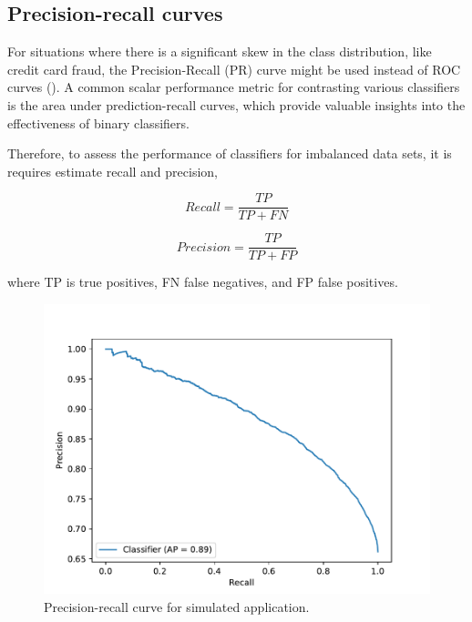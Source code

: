 \documentclass[a4paper,12pt]{article}
\numberwithin{equation}{section}
\begin{document}
   \subsection{Precision-recall curves}
   For situations where there is a significant skew in the class distribution, like credit card fraud, the Precision-Recall (PR) curve might be used instead of ROC curves (\cite{precision}). A common scalar performance metric for contrasting various classifiers is the area under prediction-recall curves, which provide valuable insights into the effectiveness of binary classifiers.\bigskip 
   
   Therefore, to assess the performance of classifiers for imbalanced data sets, it is requires estimate recall and precision, 

   \begin{equation} \label{e:recall} 
   Recall = \frac{TP}{TP + FN} 
   \end{equation} 
   
   \begin{equation} \label{e:prec} 
   Precision = \frac{TP}{TP + FP}  
   \end{equation} \smallskip 

   where TP is true positives, FN false negatives, and FP false positives.

   \begin{figure}[h]
      \centering
      \includegraphics[scale=0.6]{Plots_sim/Precision_recall_sim.pdf}
      \caption{Precision-recall curve for simulated application.}
      \label{fig:Precision_recall_sim}
  \end{figure}
\end{document}
